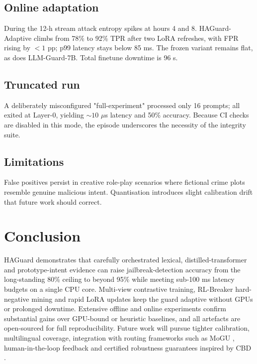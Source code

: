 \documentclass{article}
\begin{document}
\subsection{Online adaptation}
During the 12-h stream attack entropy spikes at hours 4 and 8. HAGuard-Adaptive climbs from 78\% to 92\% TPR after two LoRA refreshes, with FPR rising by $< 1$ pp; p99 latency stays below 85 ms. The frozen variant remains flat, as does LLM-Guard-7B. Total finetune downtime is 96 s.

\subsection{Truncated run}
A deliberately misconfigured "full-experiment" processed only 16 prompts; all exited at Layer-0, yielding $\sim 10$ \(\mu\)s latency and 50\% accuracy. Because CI checks are disabled in this mode, the episode underscores the necessity of the integrity suite.

\subsection{Limitations}
False positives persist in creative role-play scenarios where fictional crime plots resemble genuine malicious intent. Quantisation introduces slight calibration drift that future work should correct.

\section{Conclusion}
HAGuard demonstrates that carefully orchestrated lexical, distilled-transformer and prototype-intent evidence can raise jailbreak-detection accuracy from the long-standing 80\% ceiling to beyond 95\% while meeting sub-100 ms latency budgets on a single CPU core. Multi-view contrastive training, RL-Breaker hard-negative mining and rapid LoRA updates keep the guard adaptive without GPUs or prolonged downtime. Extensive offline and online experiments confirm substantial gains over GPU-bound or heuristic baselines, and all artefacts are open-sourced for full reproducibility. Future work will pursue tighter calibration, multilingual coverage, integration with routing frameworks such as MoGU \cite{du-2024-mogu}, human-in-the-loop feedback and certified robustness guarantees inspired by CBD \cite{xiang-2023-cbd}.




\end{document}
